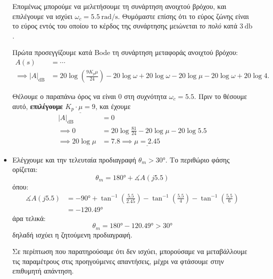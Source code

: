 \documentclass[11pt,a4paper,notitlepage,fleqn]{article}
\begin{document}
\begin{exercise}
\begin{itemize}
	Επομένως μπορούμε να μελετήσουμε τη συνάρτηση ανοιχτού βρόχου, και επιλέγουμε να
	ισχύει \( \omega_c = \SI{5.5}{\radian/\second} \). Θυμόμαστε επίσης ότι το εύρος
	ζώνης είναι το εύρος εντός του οποίου το κέρδος της συνάρτησης μειώνεται \textit{το πολύ}
	κατά \( \SI{3}{\decibel} \).
	
	Πρώτα προσεγγίζουμε κατά Bode τη συνάρτηση μεταφοράς ανοιχτού βρόχου:
	\begin{align*}
		A(s) &= \cdots \\
		\implies \left|A\right|_{\mathrm{dB}}
		&= 20\log\left(\frac{9K_pμ}{24}\right)
		- 20\log\omega + 20\log\omega -20\log μ-20\log\omega+20\log 4.
	\end{align*}
	
	Θέλουμε ο παραπάνω όρος να είναι 0 στη συχνότητα \( \omega_c = 5.5 \).
	Πριν το θέσουμε αυτό, \textbf{επιλέγουμε} \( \underline{K_p\cdot μ = 9} \), και έχουμε
	\begin{align*}
		\left|A\right|_{\mathrm{dB}}
		&= 0 \\ \implies
		0 &= 20\log\frac{81}{24} - 20\log μ -20\log 5.5 \\
		\implies 20\log μ &= 7.8 \implies \underline{μ = 2.45}
	\end{align*}
	
	\item Ελέγχουμε και την τελευταία προδιαγραφή \( \theta_m > \ang{30} \). Το περιθώριο
	φάσης ορίζεται:
	\[
	\theta_m = \ang{180} + \measuredangle A(j5.5)
	\]
	όπου:
	\begin{align*}
	\measuredangle A(j5.5)
	&= -\ang{90} + \tan^{-1}\left(\frac{5.5}{2.45}\right)
	- \tan^{-1}\left( \frac{5.5}{4} \right)
	- \tan^{-1}\left( \frac{5.5}{6} \right)
	\\
	&= -\ang{120.49}
	\end{align*}
	άρα τελικά:
	\[
	\theta_m = \ang{180} - \ang{120.49} > \ang{30}
	\]
	δηλαδή ισχύει η ζητούμενη προδιαγραφή.
	
	Σε περίπτωση που παρατηρούσαμε ότι δεν ισχύει, μπορούσαμε να μεταβάλλουμε τις παραμέτρους
	στις προηγούμενες απαντήσεις, μέχρι να φτάσουμε στην επιθυμητή απάντηση.
\end{itemize}

\end{exercise}
\end{document}
